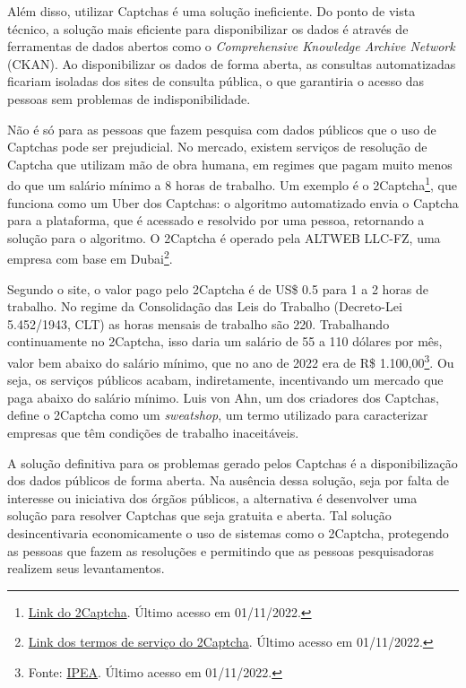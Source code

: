 \documentclass[12pt,twoside,brazilian]{book}
\begin{document}
Além disso, utilizar Captchas é uma solução ineficiente. Do ponto de
vista técnico, a solução mais eficiente para disponibilizar os dados é
através de ferramentas de dados abertos como o \emph{Comprehensive
Knowledge Archive Network} (CKAN). Ao disponibilizar os dados de forma
aberta, as consultas automatizadas ficariam isoladas dos sites de
consulta pública, o que garantiria o acesso das pessoas sem problemas de
indisponibilidade.

Não é só para as pessoas que fazem pesquisa com dados públicos que o uso
de Captchas pode ser prejudicial. No mercado, existem serviços de
resolução de Captcha que utilizam mão de obra humana, em regimes que
pagam muito menos do que um salário mínimo a 8 horas de trabalho. Um
exemplo é o 2Captcha\footnote{\href{https://2captcha.com/make-money-online}{Link
  do 2Captcha}. Último acesso em 01/11/2022.}, que funciona como um Uber
dos Captchas: o algoritmo automatizado envia o Captcha para a
plataforma, que é acessado e resolvido por uma pessoa, retornando a
solução para o algoritmo. O 2Captcha é operado pela ALTWEB LLC-FZ, uma
empresa com base em Dubai\footnote{\href{https://2captcha.com/terms-of-service}{Link
  dos termos de serviço do 2Captcha}. Último acesso em 01/11/2022.}.

Segundo o site, o valor pago pelo 2Captcha é de US\$ 0.5 para 1 a 2
horas de trabalho. No regime da Consolidação das Leis do Trabalho
(Decreto-Lei 5.452/1943, CLT) as horas mensais de trabalho são 220.
Trabalhando continuamente no 2Captcha, isso daria um salário de 55 a 110
dólares por mês, valor bem abaixo do salário mínimo, que no ano de 2022
era de R\$ 1.100,00\footnote{Fonte:
  \href{http://www.ipeadata.gov.br/exibeserie.aspx?stub=1\&serid1739471028=1739471028}{IPEA}.
  Último acesso em 01/11/2022.}. Ou seja, os serviços públicos acabam,
indiretamente, incentivando um mercado que paga abaixo do salário
mínimo. Luis von Ahn, um dos criadores dos Captchas, define o 2Captcha
como um \emph{sweatshop}, um termo utilizado para caracterizar empresas
que têm condições de trabalho inaceitáveis.

A solução definitiva para os problemas gerado pelos Captchas é a
disponibilização dos dados públicos de forma aberta. Na ausência dessa
solução, seja por falta de interesse ou iniciativa dos órgãos públicos,
a alternativa é desenvolver uma solução para resolver Captchas que seja
gratuita e aberta. Tal solução desincentivaria economicamente o uso de
sistemas como o 2Captcha, protegendo as pessoas que fazem as resoluções
e permitindo que as pessoas pesquisadoras realizem seus levantamentos.
\end{document}
